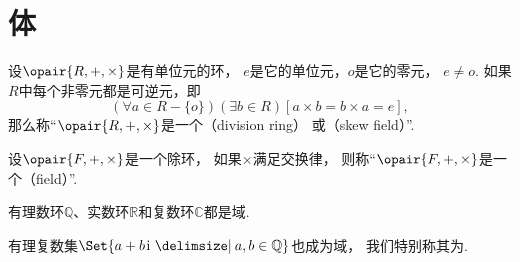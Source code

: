 \section{体}
\begin{definition}
设\(\opair{R,+,\times}\)是有单位元的环，
\(e\)是它的单位元，\(o\)是它的零元，
\(e \neq o\).
如果\(R\)中每个非零元都是可逆元，即\[
	(\forall a \in R-\{o\})(\exists b \in R)[a \times b = b \times a = e],
\]
那么称“\(\opair{R,+,\times}\)是一个（division ring）
或（skew field）”.
\end{definition}

\begin{definition}
设\(\opair{F,+,\times}\)是一个除环，
如果\(\times\)满足交换律，
则称“\(\opair{F,+,\times}\)是一个（field）”.
\end{definition}

有理数环\(\mathbb{Q}\)、实数环\(\mathbb{R}\)和复数环\(\mathbb{C}\)都是域.

有理复数集\(\Set{ a+b\iu \given a,b\in\mathbb{Q} }\)也成为域，
我们特别称其为.
